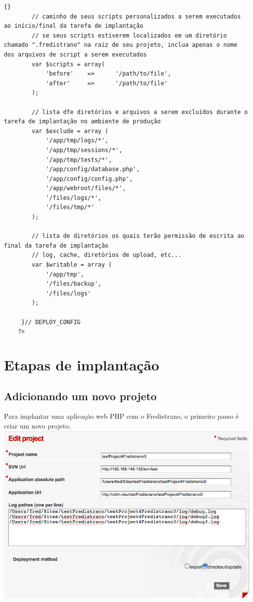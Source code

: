 \documentclass[12pt,a4paper]{report}
\begin{document}
\begin{itemize}
\begin{lstlisting}[frame=tb]{}
	 	// caminho de seus scripts personalizados a serem executados ao início/final da tarefa de implantação
		// se seus scripts estiverem localizados em um diretório chamado ".fredistrano" na raiz de seu projeto, inclua apenas o nome dos arquivos de script a serem executados
	 	var $scripts = array(
	 		'before' 	=>		'/path/to/file', 
	 		'after' 	=>		'/path/to/file' 
	 	);

		// lista dfe diretórios e arquivos a serem excluídos durante o tarefa de implantação no ambiente de produção
		var $exclude = array (
			'/app/tmp/logs/*',
			'/app/tmp/sessions/*',
			'/app/tmp/tests/*',
			'/app/config/database.php',
			'/app/config/config.php',
			'/app/webroot/files/*',
			'/files/logs/*',
			'/files/tmp/*'
		);

		// lista de diretórios os quais terão permissão de escrita ao final da tarefa de implantação
		// log, cache, diretórios de upload, etc...
		var $writable = array (
			'/app/tmp',
			'/files/backup',
			'/files/logs'
		);

	 }// DEPLOY_CONFIG
	?>
\end{lstlisting}

\end{itemize}
\newpage

\section{Etapas de implantação}

\subsection{Adicionando um novo projeto}

Para implantar uma aplicação web PHP com o Fredistrano, o primeiro passo é criar um novo projeto.\\

\includegraphics[width=1\textwidth]{doc_fredistrano1.png} 
\end{document}
